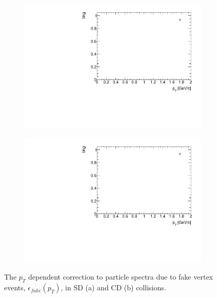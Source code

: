 \begin{figure}[H]
	\centering
	\parbox{0.484\textwidth}{
		\centering
		\begin{subfigure}[b]{\linewidth}{
				{\includegraphics[width=\linewidth, page=19]{graphics/chargedMC/bkg0max.pdf}}}
		\end{subfigure}
	}
	\quad
	\parbox{0.484\textwidth}{
		\centering
		\begin{subfigure}[b]{\linewidth}{
				{\includegraphics[width=\linewidth, page=15]{graphics/chargedMC/bkg1max.pdf}}}
		\end{subfigure}
	}
	\caption[The $p_T$ dependent correction to particle spectra due
		to fake vertex events, $\epsilon_{fake}(p_T)$, in SD and CD collisions]{The $p_T$ dependent correction to particle spectra due
	to fake vertex events, $\epsilon_{fake}(p_T)$, in SD (a) and CD (b) collisions.}
	\label{fig:fakeVertexEvents}
\end{figure}
